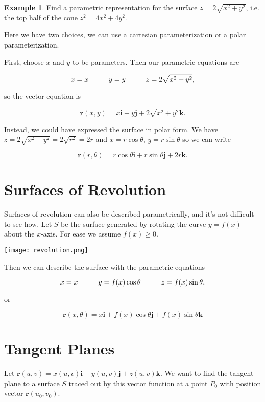 \documentclass[11pt,oneside,english]{amsart}
\theoremstyle{definition}
\newtheorem*{example}{Example}
\newcommand{\pspace}{\hspace{10mm}}
\begin{document}
\begin{example}
Find a parametric representation for the surface $z=2\sqrt{x^2+y^2}$, i.e. the top half of the cone $z^2=4x^2+4y^2$.

Here we have two choices, we can use a cartesian parameterization or a polar parameterization. 

First, choose $x$ and $y$ to be parameters. Then our parametric equations are

\[
x=x\pspace y=y \pspace z=2\sqrt{x^2+y^2},
\]

so the vector equation is

\[
\mathbf{r}(x,y)=x\mathbf{i}+y\mathbf{j}+2\sqrt{x^2+y^2}\mathbf{k}.
\]

Instead, we could have expressed the surface in polar form. We have $z=2\sqrt{x^2+y^2}=2\sqrt{r^2}=2r$ and $x=r\cos\theta$, $y=r\sin\theta$ so we can write

\[
\mathbf{r}(r,\theta)=r\cos\theta\mathbf{i}+r\sin\theta\mathbf{j}+2r\mathbf{k}.
\]
\end{example}


\section*{Surfaces of Revolution}


Surfaces of revolution can also be described parametrically, and it's not difficult to see how. Let $S$ be the surface generated by rotating the curve $y=f(x)$ about the $x$-axis. For ease we assume $f(x)\geq 0$. 

\begin{center}
\texttt{[image: revolution.png]}
\end{center}


Then we can describe the surface with the parametric equations

\[
x=x \pspace y=f(x)\cos\theta\pspace z=f(x)\sin\theta,
\]

or 

\[
\mathbf{r}(x,\theta)=x\mathbf{i}+f(x)\cos\theta\mathbf{j}+f(x)\sin\theta\mathbf{k}
\]

\section*{Tangent Planes}

Let $\mathbf{r}(u,v)=x(u,v)\mathbf{i}+y(u,v)\mathbf{j}+z(u,v)\mathbf{k}$. We want to find the tangent plane to a surface $S$ traced out by this vector function at a point $P_0$ with position vector $\mathbf{r}(u_0,v_0)$.
\end{document}
